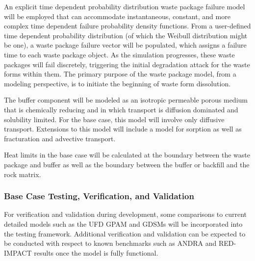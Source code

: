 
      
      An explicit time dependent probability distribution waste package failure 
      model will be employed that can accommodate instantaneous, constant, and 
      more complex time dependent failure probability density functions.
      From a user-defined time dependent probability distribution (of which the 
      Weibull distribution might be one), a waste package failure vector will be 
      populated, which assigns a failure time to each waste package object. As 
      the simulation progresses, these waste packages will fail discretely, 
      triggering the initial degradation attack for the waste forms within them. 
      The primary purpose of the waste package model, from a modeling 
      perspective, is to initiate the beginning of waste form dissolution.

      

      The buffer component will be modeled as an isotropic permeable porous 
      medium that is chemically reducing and in which transport is diffusion 
      dominated  and solubility limited.  For the base case, this model will 
      involve only diffusive transport. Extensions to this model will include a 
      model for sorption as well as fracturation and advective transport.  


      Heat limits in the base case will be calculated at the boundary between 
      the waste package and buffer as well as the boundary between the buffer or  
      backfill and the rock matrix.




 
  
\subsubsection{Base Case Testing, Verification, and Validation}

   

  For verification and validation during development, some comparisons to current 
  detailed models such as the \gls{UFD} \gls{GPAM} and GDSMs will be 
  incorporated into the testing framework. Additional verification and 
  validation can be expected to be conducted with respect to known benchmarks 
  such as \gls{ANDRA} and RED-IMPACT results once the model is fully functional.


